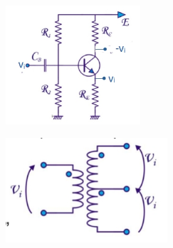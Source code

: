 \begin{minipage}{.5\textwidth}
	\centering
	\includegraphics[width=5cm]{figures/ch02/phase_splitter.jpg}
	\label{fig:classB9}
\end{minipage}%
\begin{minipage}{.5\textwidth}
	\centering
	\includegraphics[width=6cm]{figures/ch09/classB8.jpg}
	\label{fig:classB8}
\end{minipage}

